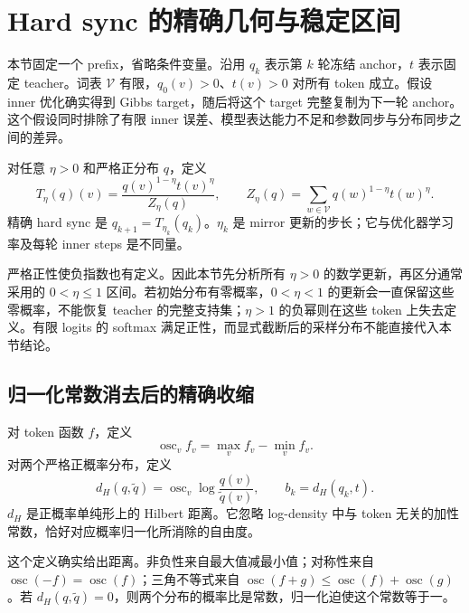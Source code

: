 \section{Hard sync 的精确几何与稳定区间}
\label{dyn:sec:hard-sync-geometry}

本节固定一个 prefix，省略条件变量。沿用 $q_k$ 表示第 $k$ 轮冻结 anchor，$t$ 表示固定 teacher。词表 $\mathcal V$ 有限，$q_0(v)>0$、$t(v)>0$ 对所有 token 成立。假设 inner 优化确实得到 Gibbs target，随后将这个 target 完整复制为下一轮 anchor。这个假设同时排除了有限 inner 误差、模型表达能力不足和参数同步与分布同步之间的差异。

\begin{definition}
对任意 $\eta>0$ 和严格正分布 $q$，定义
\begin{equation*}
 T_\eta(q)(v)
 =\frac{q(v)^{1-\eta}t(v)^\eta}{Z_\eta(q)},
 \qquad
 Z_\eta(q)=\sum_{w\in\mathcal V}q(w)^{1-\eta}t(w)^\eta.
\end{equation*}
精确 hard sync 是 $q_{k+1}=T_{\eta_k}(q_k)$。$\eta_k$ 是 mirror 更新的步长；它与优化器学习率及每轮 inner steps 是不同量。
\end{definition}

严格正性使负指数也有定义。因此本节先分析所有 $\eta>0$ 的数学更新，再区分通常采用的 $0<\eta\leq1$ 区间。若初始分布有零概率，$0<\eta<1$ 的更新会一直保留这些零概率，不能恢复 teacher 的完整支持集；$\eta>1$ 的负幂则在这些 token 上失去定义。有限 logits 的 softmax 满足正性，而显式截断后的采样分布不能直接代入本节结论。

\subsection{归一化常数消去后的精确收缩}

\begin{definition}
对 token 函数 $f$，定义
\begin{equation*}
 \operatorname{osc}_v f_v=\max_v f_v-\min_v f_v.
\end{equation*}
对两个严格正概率分布，定义
\begin{equation*}
 d_H(q,\widetilde q)
 =\operatorname{osc}_v\log\frac{q(v)}{\widetilde q(v)},
 \qquad b_k=d_H(q_k,t).
\end{equation*}
$d_H$ 是正概率单纯形上的 Hilbert 距离。它忽略 log-density 中与 token 无关的加性常数，恰好对应概率归一化所消除的自由度。
\end{definition}

这个定义确实给出距离。非负性来自最大值减最小值；对称性来自 $\operatorname{osc}(-f)=\operatorname{osc}(f)$；三角不等式来自 $\operatorname{osc}(f+g)\leq\operatorname{osc}(f)+\operatorname{osc}(g)$。若 $d_H(q,\widetilde q)=0$，则两个分布的概率比是常数，归一化迫使这个常数等于一。

